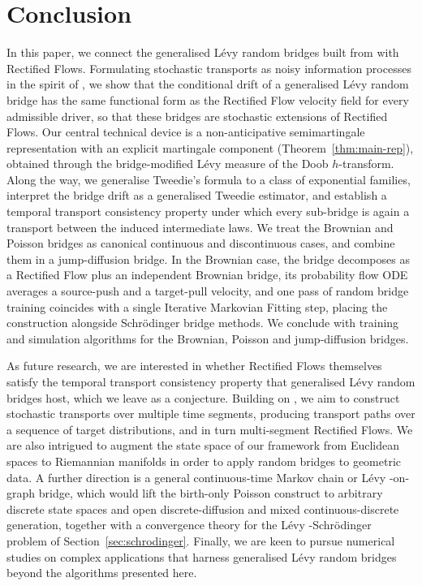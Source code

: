 \documentclass{article}
\newcommand{\levy}{{L\'evy }}
\newcommand{\Schrodinger}{Schr\"odinger\xspace}
\theoremstyle{definition}
\begin{document}
\section{Conclusion}\label{sec:conclusion}
In this paper, we connect the generalised \levy random bridges built from \cite{goria_random-bridges_2025} with Rectified Flows. Formulating stochastic transports as noisy information processes in the spirit of \cite{BrodyHughstonMacrina_2008, BrodyHughston_2005, hoylehmacrinamenguturk_2020, Menguturk_2016}, we show that the conditional drift of a generalised \levy random bridge has the same functional form as the Rectified Flow velocity field for every admissible driver, so that these bridges are stochastic extensions of Rectified Flows. Our central technical device is a non-anticipative semimartingale representation with an explicit martingale component (Theorem~\ref{thm:main-rep}), obtained through the bridge-modified \levy measure of the Doob $h$-transform. Along the way, we generalise Tweedie's formula to a class of exponential families, interpret the bridge drift as a generalised Tweedie estimator, and establish a temporal transport consistency property under which every sub-bridge is again a transport between the induced intermediate laws. We treat the Brownian and Poisson bridges as canonical continuous and discontinuous cases, and combine them in a jump-diffusion bridge. In the Brownian case, the bridge decomposes as a Rectified Flow plus an independent Brownian bridge, its probability flow ODE averages a source-push and a target-pull velocity, and one pass of random bridge training coincides with a single Iterative Markovian Fitting step, placing the construction alongside \Schrodinger bridge methods. We conclude with training and simulation algorithms for the Brownian, Poisson and jump-diffusion bridges.

As future research, we are interested in whether Rectified Flows themselves satisfy the temporal transport consistency property that generalised \levy random bridges host, which we leave as a conjecture. Building on \cite{menguturkmenguturk_2020}, we aim to construct stochastic transports over multiple time segments, producing transport paths over a sequence of target distributions, and in turn multi-segment Rectified Flows. We are also intrigued to augment the state space of our framework from Euclidean spaces to Riemannian manifolds in order to apply random bridges to geometric data. A further direction is a general continuous-time Markov chain or \levy-on-graph bridge, which would lift the birth-only Poisson construct to arbitrary discrete state spaces and open discrete-diffusion and mixed continuous-discrete generation, together with a convergence theory for the \levy-\Schrodinger problem of Section~\ref{sec:schrodinger}. Finally, we are keen to pursue numerical studies on complex applications that harness generalised \levy random bridges beyond the algorithms presented here.
\end{document}

